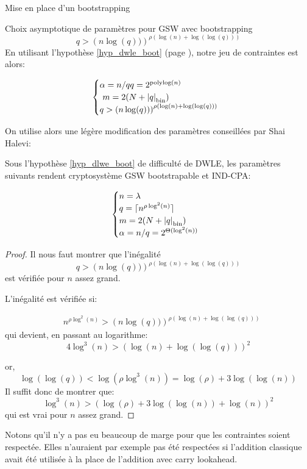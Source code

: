 \begin{section}{Mise en place d'un bootstrapping}
\begin{subsection}{Choix asymptotique de paramètres pour GSW avec bootstrapping}
\begin{equation}
q > {\left(n\log(q))\right)}^{\rho \left(\log(n) + \log(\log(q))\right)}
\end{equation}
En utilisant l'hypothèse  \ref{hyp_dwle_boot} (page \pageref{hyp_dwle_boot}), notre jeu de contraintes est alors:

\[ \begin{cases}
\alpha  = n /q
	q = 2^\text{polylog$(n)$}\\ 
	m = 2(N + \bnorm{q}) \\  
	q > {\left(n\log(q))\right)}^{\rho \left(\log(n) + \log(\log(q))\right)}
	\end{cases} \]

On utilise alors une légère modification des paramètres conseillées par Shai Halevi:
\begin{thm}
Sous l'hypothèse \ref{hyp_dlwe_boot} de difficulté de DWLE, les paramètres suivants rendent cryptosystème GSW bootstrapable et IND-CPA:

\[ \begin{cases}
 	n = \lambda \\
	q = \lceil n^{\rho \log^2(n)}\rceil \\
	m = 2(N + \bnorm{q}) \\  
	\alpha = n/q = 2^{\Theta(\log^2(n))}
	\end{cases} \]
\end{thm}
\begin{proof}
Il nous faut montrer que l'inégalité 
	\[ q > {\left(n\log(q))\right)}^{\rho \left(\log(n) +
	\log(\log(q))\right)} \]
est vérifiée pour $n$ assez grand.

L'inégalité est vérifiée si:

	\begin{align*} &n^{\rho \log^2(n)} > {\left(n\log(q))\right)}^{\rho \left(\log(n) +
	\log(\log(q))\right)}\end{align*}
qui devient, en passant au logarithme:
\[ 4 \log^3(n) > {(\log(n) + \log(\log(q)))}^2 \]

or,
\[ \log(\log(q)) < \log(\rho \log^3(n)) = \log(\rho) + 3 \log(\log(n)) \]
Il suffit donc de montrer que:
\[ \log^3(n) > {(\log(\rho) + 3\log(\log(n)) + \log(n))}^2 \]
qui est vrai pour $n$ assez grand.
\end{proof}
\begin{rmq}
Notons qu'il n'y a pas eu beaucoup de marge pour que les contraintes soient
respectée. Elles n'auraient par exemple pas été respectées si l'addition 
classique avait été utilisée à la place de l'addition avec carry lookahead.
\end{rmq}


\end{subsection}



\end{section}
